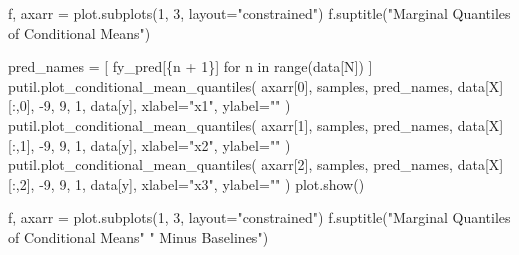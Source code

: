 \documentclass[
  letterpaper,
  DIV=11,
  numbers=noendperiod]{scrartcl}
\newenvironment{Shaded}{\begin{snugshade}}{\end{snugshade}}
\newcommand{\BuiltInTok}[1]{\textcolor[rgb]{0.00,0.23,0.31}{#1}}
\newcommand{\ControlFlowTok}[1]{\textcolor[rgb]{0.00,0.23,0.31}{#1}}
\newcommand{\DecValTok}[1]{\textcolor[rgb]{0.68,0.00,0.00}{#1}}
\newcommand{\KeywordTok}[1]{\textcolor[rgb]{0.00,0.23,0.31}{#1}}
\newcommand{\NormalTok}[1]{\textcolor[rgb]{0.00,0.23,0.31}{#1}}
\newcommand{\OperatorTok}[1]{\textcolor[rgb]{0.37,0.37,0.37}{#1}}
\newcommand{\SpecialCharTok}[1]{\textcolor[rgb]{0.37,0.37,0.37}{#1}}
\newcommand{\SpecialStringTok}[1]{\textcolor[rgb]{0.13,0.47,0.30}{#1}}
\newcommand{\StringTok}[1]{\textcolor[rgb]{0.13,0.47,0.30}{#1}}
\begin{document}
\begin{Shaded}
\begin{Highlighting}[]
\NormalTok{f, axarr }\OperatorTok{=}\NormalTok{ plot.subplots(}\DecValTok{1}\NormalTok{, }\DecValTok{3}\NormalTok{, layout}\OperatorTok{=}\StringTok{"constrained"}\NormalTok{)}
\NormalTok{f.suptitle(}\StringTok{"Marginal Quantiles of Conditional Means"}\NormalTok{)}

\NormalTok{pred\_names }\OperatorTok{=}\NormalTok{ [ }\SpecialStringTok{f\textquotesingle{}y\_pred[}\SpecialCharTok{\{}\NormalTok{n }\OperatorTok{+} \DecValTok{1}\SpecialCharTok{\}}\SpecialStringTok{]\textquotesingle{}}
               \ControlFlowTok{for}\NormalTok{ n }\KeywordTok{in} \BuiltInTok{range}\NormalTok{(data[}\StringTok{\textquotesingle{}N\textquotesingle{}}\NormalTok{]) ]}
\NormalTok{putil.plot\_conditional\_mean\_quantiles(}
\NormalTok{  axarr[}\DecValTok{0}\NormalTok{], samples, pred\_names,}
\NormalTok{  data[}\StringTok{\textquotesingle{}X\textquotesingle{}}\NormalTok{][:,}\DecValTok{0}\NormalTok{], }\OperatorTok{{-}}\DecValTok{9}\NormalTok{, }\DecValTok{9}\NormalTok{, }\DecValTok{1}\NormalTok{,}
\NormalTok{  data[}\StringTok{\textquotesingle{}y\textquotesingle{}}\NormalTok{], xlabel}\OperatorTok{=}\StringTok{"x1"}\NormalTok{, ylabel}\OperatorTok{=}\StringTok{""}
\NormalTok{)}
\NormalTok{putil.plot\_conditional\_mean\_quantiles(}
\NormalTok{  axarr[}\DecValTok{1}\NormalTok{], samples, pred\_names,}
\NormalTok{  data[}\StringTok{\textquotesingle{}X\textquotesingle{}}\NormalTok{][:,}\DecValTok{1}\NormalTok{], }\OperatorTok{{-}}\DecValTok{9}\NormalTok{, }\DecValTok{9}\NormalTok{, }\DecValTok{1}\NormalTok{,}
\NormalTok{  data[}\StringTok{\textquotesingle{}y\textquotesingle{}}\NormalTok{], xlabel}\OperatorTok{=}\StringTok{"x2"}\NormalTok{, ylabel}\OperatorTok{=}\StringTok{""}
\NormalTok{)}
\NormalTok{putil.plot\_conditional\_mean\_quantiles(}
\NormalTok{  axarr[}\DecValTok{2}\NormalTok{], samples, pred\_names,}
\NormalTok{  data[}\StringTok{\textquotesingle{}X\textquotesingle{}}\NormalTok{][:,}\DecValTok{2}\NormalTok{], }\OperatorTok{{-}}\DecValTok{9}\NormalTok{, }\DecValTok{9}\NormalTok{, }\DecValTok{1}\NormalTok{,}
\NormalTok{  data[}\StringTok{\textquotesingle{}y\textquotesingle{}}\NormalTok{], xlabel}\OperatorTok{=}\StringTok{"x3"}\NormalTok{, ylabel}\OperatorTok{=}\StringTok{""}
\NormalTok{)}
\NormalTok{plot.show()}

\NormalTok{f, axarr }\OperatorTok{=}\NormalTok{ plot.subplots(}\DecValTok{1}\NormalTok{, }\DecValTok{3}\NormalTok{, layout}\OperatorTok{=}\StringTok{"constrained"}\NormalTok{)}
\NormalTok{f.suptitle(}\StringTok{"Marginal Quantiles of Conditional Means"}
           \StringTok{" Minus Baselines"}\NormalTok{)}


\end{Highlighting}
\end{Shaded}
\end{document}
